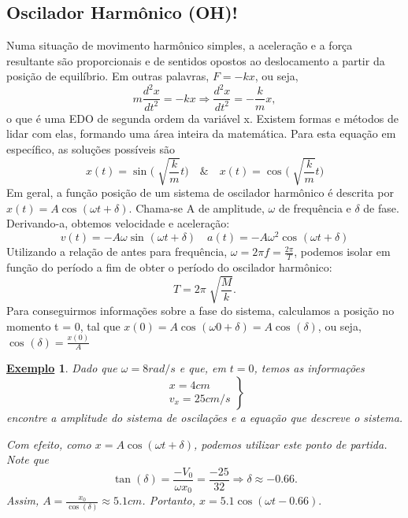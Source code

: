 \documentclass{article}
\newtheorem{example}{\underline{Exemplo}}
\begin{document}
\subsection{Oscilador Harmônico (OH)!}
  Numa situação de movimento harmônico simples, a aceleração e a força resultante são
proporcionais e de sentidos opostos ao deslocamento a partir da posição de equilíbrio.
Em outras palavras, \(F = -kx\), ou seja, 
  \[
    m\frac{d^{2}x}{dt^{2}}=-kx \Rightarrow \frac{d^{2}x}{dt^{2}}=-\frac{k}{m}x,
  \]
o que é uma EDO de segunda ordem da variável x. Existem formas e métodos de lidar com elas,
formando uma área inteira da matemática. Para esta equação em específico, as soluções possíveis são 
  \[
    x(t)=\sin^{}{\biggl(\sqrt[]{\frac{k}{m}}t\biggr)} \quad\&\quad x(t)=\cos^{}{\biggl(\sqrt[]{\frac{k}{m}}t\biggr)} 
  \]
  Em geral, a função posição de um sistema de oscilador harmônico é descrita por \(x(t) = A\cos^{}{(\omega t + \delta )}.\)
Chama-se A de amplitude, \(\omega \) de frequência e \(\delta \) de fase. Derivando-a, obtemos velocidade 
e aceleração: 
  \[
    v(t) = -A\omega \sin^{}{(\omega t + \delta )}\quad a(t) = -A\omega^{2}\cos^{}{(\omega t + \delta )}
  \]
  Utilizando a relação de antes para frequência, \(\omega = 2\pi f = \frac{2\pi }{T}\), podemos
isolar em função do período a fim de obter o período do oscilador harmônico: 
  \[
    T = 2\pi \sqrt[]{\frac{M}{k}}.
  \]
  Para conseguirmos informações sobre a fase do sistema, calculamos a posição no momento t = 0, tal que
 \(x(0) = A\cos^{}{(\omega 0 + \delta )} = A\cos^{}{(\delta )}\), ou seja, \(\cos^{}{(\delta )}=\frac{x(0)}{A}\)
 \begin{example}
  Dado que \(\omega = 8 rad/s\) e que, em \(t=0\), temos as informações 
    \[
       \left.\begin{array}{ll}
         x=4cm\\
         v_{x} = 25 cm/s
     \end{array}\right\}
    \] 
  encontre a amplitude do sistema de oscilações e a equação que descreve o sistema.

  Com efeito, como \(x = A \cos{(\omega t + \delta )}\), podemos utilizar este ponto de partida. Note que 
    \[
      \tan{(\delta )} = \frac{-V_{0}}{\omega x_{0}} = \frac{-25}{32} \Rightarrow \delta \approx -0.66.
    \]
  Assim, \(A = \frac{x_{0}}{\cos{(\delta )}}\approx 5.1cm\). Portanto, \(x = 5.1\cos{(\omega t - 0.66)}.\)
 \end{example}
\end{document}
